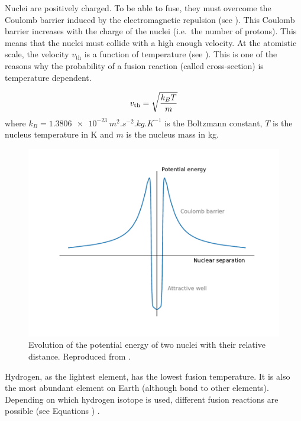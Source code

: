 Nuclei are positively charged.
To be able to fuse, they must overcome the Coulomb barrier induced by the electromagnetic repulsion (see ).
This Coulomb barrier increases with the charge of the nuclei (i.e.\ the number of protons).
This means that the nuclei must collide with a high enough velocity.
At the atomistic scale, the velocity $v_\mathrm{th}$ is a function of temperature (see ).
This is one of the reasons why the probability of a fusion reaction (called cross-section) is temperature dependent.

\begin{equation}
    v_\mathrm{th} = \sqrt{\frac{k_B T}{m}}
    \labeq{thermal velocity}
\end{equation}
where $k_B = \SI{1.3806e-23}{m^2.s^{-2}.kg.K^{-1}}$ is the Boltzmann constant, $T$ is the nucleus temperature in \si{K} and $m$ is the nucleus mass in \si{kg}.


\begin{figure} [h]
    \centering
    \includegraphics[width=\linewidth]{Figures/Chapter1/potential_energy.pdf}
    \caption{Evolution of the potential energy of two nuclei with their relative distance. Reproduced from \cite{mccracken_fusion_2013}.}
\end{figure}

Hydrogen, as the lightest element, has the lowest fusion temperature.
It is also the most abundant element on Earth (although bond to other elements).
Depending on which hydrogen \gls{isotope} is used, different fusion reactions are possible (see Equations ) \cite{forrest_fendl-3_2012}.

